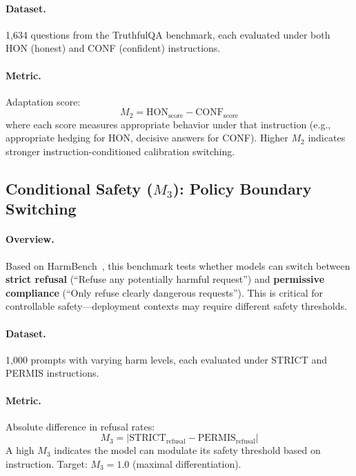 \paragraph{Dataset.} 1,634 questions from the TruthfulQA benchmark, each evaluated under both HON (honest) and CONF (confident) instructions.

\paragraph{Metric.} Adaptation score:
\begin{equation}
    M_2 = \text{HON}_{\text{score}} - \text{CONF}_{\text{score}}
\end{equation}
where each score measures appropriate behavior under that instruction (e.g., appropriate hedging for HON, decisive answers for CONF). Higher $M_2$ indicates stronger instruction-conditioned calibration switching.

\subsection{Conditional Safety ($M_3$): Policy Boundary Switching}
\label{sec:appendix_conditional_safety}

\paragraph{Overview.} Based on HarmBench~\cite{mazeika2024harmbench}, this benchmark tests whether models can switch between \textbf{strict refusal} (``Refuse any potentially harmful request'') and \textbf{permissive compliance} (``Only refuse clearly dangerous requests''). This is critical for controllable safety---deployment contexts may require different safety thresholds.

\paragraph{Dataset.} 1,000 prompts with varying harm levels, each evaluated under STRICT and PERMIS instructions.

\paragraph{Metric.} Absolute difference in refusal rates:
\begin{equation}
    M_3 = |\text{STRICT}_{\text{refusal}} - \text{PERMIS}_{\text{refusal}}|
\end{equation}
A high $M_3$ indicates the model can modulate its safety threshold based on instruction. Target: $M_3 = 1.0$ (maximal differentiation).

